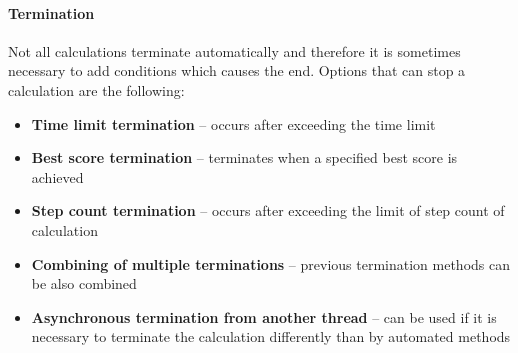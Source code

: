 \paragraph{Termination}
Not all calculations terminate automatically and therefore it is sometimes necessary to add conditions which causes the end. Options that can stop a calculation are the following:

\begin{itemize}
\item \textbf{Time limit termination} -- occurs after exceeding the time limit
\item \textbf{Best score termination} -- terminates when a specified best score is achieved
\item \textbf{Step count termination} -- occurs after exceeding the limit of step count of calculation
\item \textbf{Combining of multiple terminations} -- previous termination methods can be also combined
\item \textbf{Asynchronous termination from another thread} -- can be used if it is necessary to terminate the calculation differently than by automated methods
\end{itemize}

